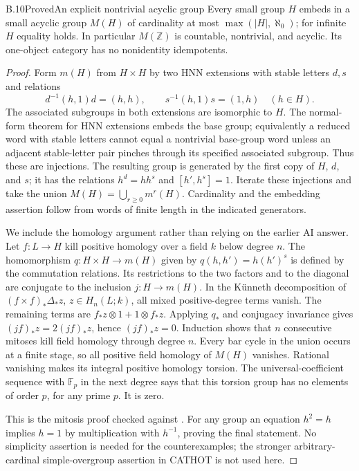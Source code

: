 \begin{claim}{B.10}{Proved}{An explicit nontrivial acyclic group}
Every small group $H$ embeds in a small acyclic group $M(H)$ of cardinality at most $\max(|H|,\aleph_0)$; for infinite $H$ equality holds. In particular $M(\mathbb Z)$ is countable, nontrivial, and acyclic. Its one-object category has no nonidentity idempotents.
\end{claim}
\begin{proof}
Form $m(H)$ from $H\times H$ by two HNN extensions with stable letters $d,s$ and relations
\[
 d^{-1}(h,1)d=(h,h),\qquad s^{-1}(h,1)s=(1,h)\quad(h\in H).
\]
The associated subgroups in both extensions are isomorphic to $H$. The normal-form theorem for HNN extensions embeds the base group; equivalently a reduced word with stable letters cannot equal a nontrivial base-group word unless an adjacent stable-letter pair pinches through its specified associated subgroup. Thus these are injections. The resulting group is generated by the first copy of $H$, $d$, and $s$; it has the relations $h^d=hh^s$ and $[h',h^s]=1$. Iterate these injections and take the union $M(H)=\bigcup_{r\geq0}m^r(H)$. Cardinality and the embedding assertion follow from words of finite length in the indicated generators.

We include the homology argument rather than relying on the earlier AI answer. Let $f:L\to H$ kill positive homology over a field $k$ below degree $n$. The homomorphism $q:H\times H\to m(H)$ given by $q(h,h')=h(h')^s$ is defined by the commutation relations. Its restrictions to the two factors and to the diagonal are conjugate to the inclusion $j:H\to m(H)$. In the K\"unneth decomposition of $(f\times f)_*\Delta_*z$, $z\in H_n(L;k)$, all mixed positive-degree terms vanish. The remaining terms are $f_*z\otimes1+1\otimes f_*z$. Applying $q_*$ and conjugacy invariance gives $(jf)_*z=2(jf)_*z$, hence $(jf)_*z=0$. Induction shows that $n$ consecutive mitoses kill field homology through degree $n$. Every bar cycle in the union occurs at a finite stage, so all positive field homology of $M(H)$ vanishes. Rational vanishing makes its integral positive homology torsion. The universal-coefficient sequence with $\mathbb F_p$ in the next degree says that this torsion group has no elements of order $p$, for any prime $p$. It is zero.

This is the mitosis proof checked against \citet[Proposition 4.1, Theorem 4.2, and Lemma 5.4]{RootBDH1980}. For any group an equation $h^2=h$ implies $h=1$ by multiplication with $h^{-1}$, proving the final statement. No simplicity assertion is needed for the counterexamples; the stronger arbitrary-cardinal simple-overgroup assertion in CATHOT is not used here.
\end{proof}

